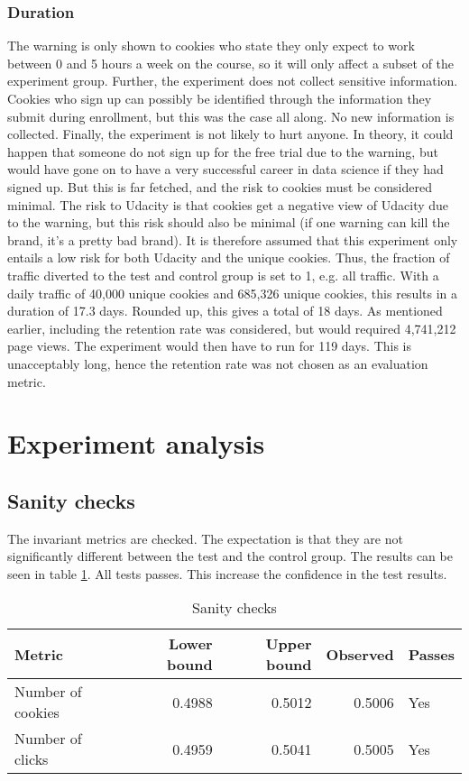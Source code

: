 \documentclass[12pt]{article}
\begin{document}
\subsubsection{Duration}
The warning is only shown to cookies who state they only expect to work between 0 and 5 hours a week on the course, so it will only affect a subset of the experiment group. Further, the experiment does not collect sensitive information. Cookies who sign up can possibly be identified through the information they submit during enrollment, but this was the case all along. No new information is collected. Finally, the experiment is not likely to hurt anyone. In theory, it could happen that someone do not sign up for the free trial due to the warning, but would have gone on to have a very successful career in data science if they had signed up. But this is far fetched, and  the risk to cookies must be considered minimal. The risk to Udacity is that cookies get a negative view of Udacity due to the warning, but this risk should also be minimal (if one warning can kill the brand, it's a pretty bad brand).
\newline
It is therefore assumed that this experiment only entails a low risk for both Udacity and the unique cookies. 
\newline
Thus, the fraction of traffic diverted to the test and control group is set to 1, e.g. all traffic. With a daily traffic of 40,000 unique cookies and 685,326 unique cookies, this results in a duration of 17.3 days. Rounded up, this gives a total of 18 days.
\newline
As mentioned earlier, including the retention rate was considered, but would required 4,741,212 page views. The experiment would then have to run for 119 days. This is unacceptably long, hence the retention rate was not chosen as an evaluation metric.

\section{Experiment analysis}
\subsection{Sanity checks}
The invariant metrics are checked. The expectation is that they are not significantly different between the test and the control group. The results can be seen in table \ref{tbl:sanity}. All tests passes. This increase the confidence in the test results.

\begin{table}[h]
\centering
\caption{Sanity checks}
\label{tbl:sanity}
\begin{tabular}{@{}lrrrl@{}}
\toprule
\textbf{Metric} & \textbf{Lower bound} & \textbf{Upper bound} & \textbf{Observed} & \textbf{Passes} \\
\midrule
Number of cookies & 0.4988	&	0.5012 & 0.5006 & Yes	\\
Number of clicks  & 0.4959  & 0.5041 & 0.5005 & Yes \\
\bottomrule
\end{tabular}
\end{table}
\end{document}
